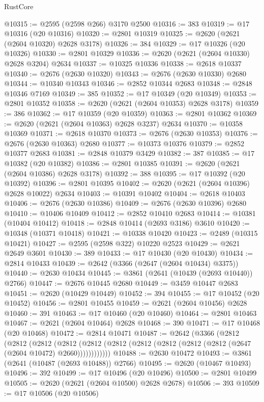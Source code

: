 \begin{lexlean}{RustCore}
\begin{coremodule}
@10315 := @2595 (@2598 @266) @3170 @2500
@10316 := 383
@10319 := @17 @10316 (@20 @10316)
@10320 := @2801 @10319
@10325 := @2620 (@2621 (@2604 @10320) @2628 @3178)
@10326 := 384
@10329 := @17 @10326 (@20 @10326)
@10330 := @2801 @10329
@10336 := @2620 (@2621 (@2604 @10330) @2628 @3204) @2634
@10337 := @10325 @10336
@10338 := @2618 @10337
@10340 := @2676 (@2630 @10320)
@10343 := @2676 (@2630 @10330) @2680
@10344 := @10340 @10343
@10346 := @2852 @10344 @2683
@10348 := @2848 @10346 @7169
@10349 := 385
@10352 := @17 @10349 (@20 @10349)
@10353 := @2801 @10352
@10358 := @2620 (@2621 (@2604 @10353) @2628 @3178)
@10359 := 386
@10362 := @17 @10359 (@20 @10359)
@10363 := @2801 @10362
@10369 := @2620 (@2621 (@2604 @10363) @2628 @3237) @2634
@10370 := @10358 @10369
@10371 := @2618 @10370
@10373 := @2676 (@2630 @10353)
@10376 := @2676 (@2630 @10363) @2680
@10377 := @10373 @10376
@10379 := @2852 @10377 @2683
@10381 := @2848 @10379 @3429
@10382 := 387
@10385 := @17 @10382 (@20 @10382)
@10386 := @2801 @10385
@10391 := @2620 (@2621 (@2604 @10386) @2628 @3178)
@10392 := 388
@10395 := @17 @10392 (@20 @10392)
@10396 := @2801 @10395
@10402 := @2620 (@2621 (@2604 @10396) @2628 @10022) @2634
@10403 := @10391 @10402
@10404 := @2618 @10403
@10406 := @2676 (@2630 @10386)
@10409 := @2676 (@2630 @10396) @2680
@10410 := @10406 @10409
@10412 := @2852 @10410 @2683
@10414 := @10381 (@10404 @10412)
@10418 := @2848 @10414 (@2693 @3186) @3610
@10420 := @10348 (@10371 @10418)
@10421 := @10338 @10420
@10423 := @2489 (@10315 @10421)
@10427 := @2595 (@2598 @322) @10220 @2523
@10429 := @2621 @2649 @3601
@10430 := 389
@10433 := @17 @10430 (@20 @10430)
@10434 := @2814 @10433
@10439 := @2642 (@3366 (@2647 (@2604 @10434) @3375))
@10440 := @2630 @10434
@10445 := @3861 (@2641 (@10439 (@2693 @10440)) @2766)
@10447 := @2676 @10445 @2680
@10449 := @3459 @10447 @2683
@10451 := @2620 (@10429 @10449)
@10452 := 394
@10455 := @17 @10452 (@20 @10452)
@10456 := @2801 @10455
@10459 := @2621 (@2604 @10456) @2628
@10460 := 391
@10463 := @17 @10460 (@20 @10460)
@10464 := @2801 @10463
@10467 := @2621 (@2604 @10464) @2628
@10468 := 390
@10471 := @17 @10468 (@20 @10468)
@10472 := @2814 @10471
@10487 := @2642
    (@3366
      (@2812
        (@2812
          (@2812
            (@2812 (@2812 (@2812 (@2812 (@2812 (@2812 (@2812 (@2647 (@2604 @10472) @2660))))))))))))
@10488 := @2630 @10472
@10493 := @3861 (@2641 (@10487 (@2693 @10488)) @2766)
@10495 := @2620 (@10467 @10493)
@10496 := 392
@10499 := @17 @10496 (@20 @10496)
@10500 := @2801 @10499
@10505 := @2620 (@2621 (@2604 @10500) @2628 @2678)
@10506 := 393
@10509 := @17 @10506 (@20 @10506)

\end{coremodule}
\end{lexlean}

